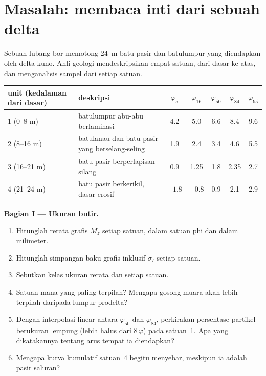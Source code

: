 \section{Masalah: membaca inti dari sebuah delta}

\begin{problem}
\label{pb:b1:clastic-sediments:1}
Sebuah lubang bor memotong \qty{24}{m} batu pasir dan batulumpur yang diendapkan oleh delta kuno. Ahli geologi mendeskripsikan empat satuan, dari dasar ke atas, dan menganalisis sampel dari setiap satuan.

\smallskip
\begin{center}\small
\begin{tabular}{@{}l>{\raggedright\arraybackslash}p{4.2cm}ccccc@{}}
\hline
unit (kedalaman dari dasar) & deskripsi & $\varphi_5$ & $\varphi_{16}$ & $\varphi_{50}$ & $\varphi_{84}$ & $\varphi_{95}$ \\
\hline
1 (0--8 m) & batulumpur abu-abu berlaminasi & 4.2 & 5.0 & 6.6 & 8.4 & 9.6 \\
2 (8--16 m) & batulanau dan batu pasir yang berselang-seling & 1.9 & 2.4 & 3.4 & 4.6 & 5.5 \\
3 (16--21 m) & batu pasir berperlapisan silang & 0.9 & 1.25 & 1.8 & 2.35 & 2.7 \\
4 (21--24 m) & batu pasir berkerikil, dasar erosif & $-1.8$ & $-0.8$ & 0.9 & 2.1 & 2.9 \\
\hline
\end{tabular}
\end{center}

\medskip
\noindent\textbf{Bagian I --- Ukuran butir.}
\begin{enumerate}
  \item Hitunglah rerata grafis $M_z$ setiap satuan, dalam satuan phi dan dalam milimeter.
  \item Hitunglah simpangan baku grafis inklusif $\sigma_I$ setiap satuan.
  \item Sebutkan kelas ukuran rerata dan  setiap satuan.
  \item Satuan mana yang paling terpilah? Mengapa gosong muara akan lebih terpilah daripada lumpur prodelta?
  \item Dengan interpolasi linear antara $\varphi_{50}$ dan $\varphi_{84}$, perkirakan persentase partikel berukuran lempung (lebih halus dari $8\,\varphi$) pada satuan~1. Apa yang dikatakannya tentang arus tempat ia diendapkan?
  \item Mengapa kurva kumulatif satuan~4 begitu menyebar, meskipun ia adalah pasir saluran?
\end{enumerate}


\end{problem}
